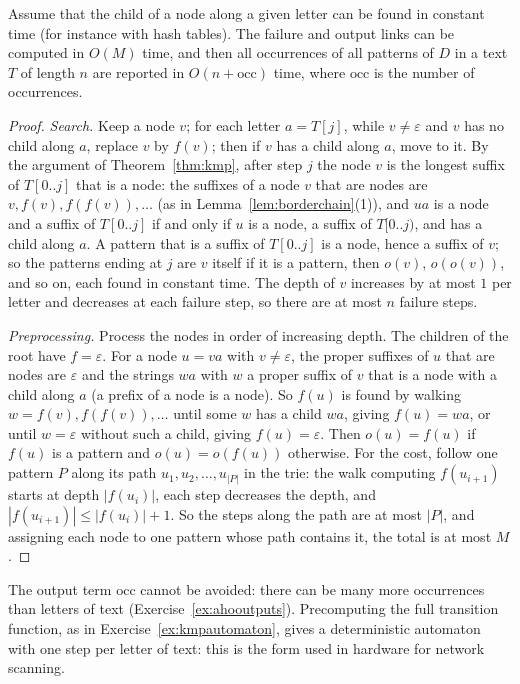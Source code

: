 \begin{theorem}\label{thm:aho}
Assume that the child of a node along a given letter can be found in constant time (for instance with hash tables). The failure and output links can be computed in $O(M)$ time, and then all occurrences of all patterns of $D$ in a text $T$ of length $n$ are reported in $O(n+\mathrm{occ})$ time, where $\mathrm{occ}$ is the number of occurrences.
\end{theorem}
\begin{proof}
\emph{Search.} Keep a node $v$; for each letter $a=T[j]$, while $v\ne\varepsilon$ and $v$ has no child along $a$, replace $v$ by $f(v)$; then if $v$ has a child along $a$, move to it. By the argument of Theorem~\ref{thm:kmp}, after step $j$ the node $v$ is the longest suffix of $T[0..j]$ that is a node: the suffixes of a node $v$ that are nodes are $v,f(v),f(f(v)),\dots$ (as in Lemma~\ref{lem:borderchain}(1)), and $ua$ is a node and a suffix of $T[0..j]$ if and only if $u$ is a node, a suffix of $T[0..j)$, and has a child along $a$.
A pattern that is a suffix of $T[0..j]$ is a node, hence a suffix of $v$; so the patterns ending at $j$ are $v$ itself if it is a pattern, then $o(v)$, $o(o(v))$, and so on, each found in constant time. The depth of $v$ increases by at most $1$ per letter and decreases at each failure step, so there are at most $n$ failure steps.

\emph{Preprocessing.} Process the nodes in order of increasing depth. The children of the root have $f=\varepsilon$. For a node $u=va$ with $v\ne\varepsilon$, the proper suffixes of $u$ that are nodes are $\varepsilon$ and the strings $wa$ with $w$ a proper suffix of $v$ that is a node with a child along $a$ (a prefix of a node is a node). So $f(u)$ is found by walking $w=f(v),f(f(v)),\dots$ until some $w$ has a child $wa$, giving $f(u)=wa$, or until $w=\varepsilon$ without such a child, giving $f(u)=\varepsilon$.
Then $o(u)=f(u)$ if $f(u)$ is a pattern and $o(u)=o(f(u))$ otherwise. For the cost, follow one pattern $P$ along its path $u_1,u_2,\dots,u_{|P|}$ in the trie: the walk computing $f(u_{i+1})$ starts at depth $|f(u_i)|$, each step decreases the depth, and $|f(u_{i+1})|\le|f(u_i)|+1$. So the steps along the path are at most $|P|$, and assigning each node to one pattern whose path contains it, the total is at most $M$.
\end{proof}

The output term $\mathrm{occ}$ cannot be avoided: there can be many more occurrences than letters of text (Exercise~\ref{ex:ahooutputs}). Precomputing the full transition function, as in Exercise~\ref{ex:kmpautomaton}, gives a deterministic automaton with one step per letter of text: this is the form used in hardware for network scanning.

